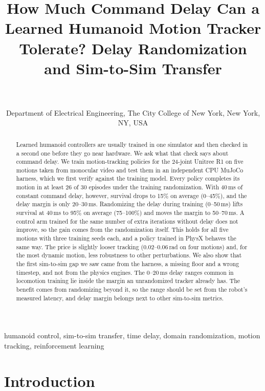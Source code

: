 \documentclass{l4dc2026}
\title[Delay Randomization and Sim-to-Sim Transfer]{How Much Command Delay Can a Learned Humanoid Motion Tracker Tolerate? Delay Randomization and Sim-to-Sim Transfer}
\author{%
 \Name{Shaoqin Li} \Email{sli3@ccny.cuny.edu}\\
 \Name{Yi Sun}\\
 \addr Department of Electrical Engineering, The City College of New York, New York, NY, USA%
}
\begin{document}
\maketitle

\begin{abstract}%
Learned humanoid controllers are usually trained in one simulator and then checked in a second one before they go near hardware.
We ask what that check says about command delay.
We train motion-tracking policies for the 24-joint Unitree R1 on five motions taken from monocular video and test them in an independent CPU MuJoCo harness, which we first verify against the training model.
Every policy completes its motion in at least 26 of 30 episodes under the training randomization.
With 40\,ms of constant command delay, however, survival drops to 15\% on average (0--45\%), and the delay margin is only 20--30\,ms.
Randomizing the delay during training (0--50\,ms) lifts survival at 40\,ms to 95\% on average (75--100\%) and moves the margin to 50--70\,ms.
A control arm trained for the same number of extra iterations without delay does not improve, so the gain comes from the randomization itself.
This holds for all five motions with three training seeds each, and a policy trained in PhysX behaves the same way.
The price is slightly looser tracking (0.02--0.06\,rad on four motions) and, for the most dynamic motion, less robustness to other perturbations.
We also show that the first sim-to-sim gap we saw came from the harness, a missing floor and a wrong timestep, and not from the physics engines.
The 0--20\,ms delay ranges common in locomotion training lie inside the margin an unrandomized tracker already has.
The benefit comes from randomizing beyond it, so the range should be set from the robot's measured latency, and delay margin belongs next to other sim-to-sim metrics.%
\end{abstract}

\begin{keywords}%
humanoid control, sim-to-sim transfer, time delay, domain randomization, motion tracking, reinforcement learning%
\end{keywords}

\section{Introduction}
\end{document}
